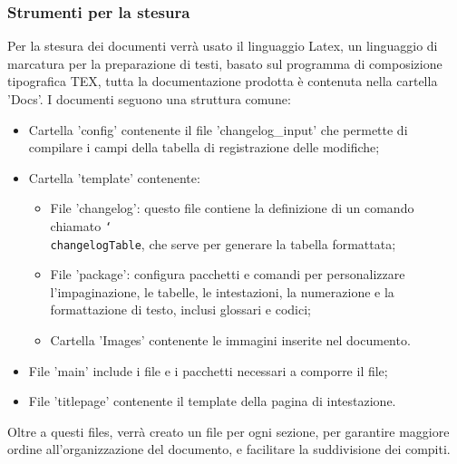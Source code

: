         \subsubsection{Strumenti per la stesura}
        Per la stesura dei documenti verrà usato il linguaggio Latex, un linguaggio di marcatura per la preparazione di testi, basato sul programma di
        composizione tipografica TEX, tutta la documentazione prodotta è contenuta nella cartella 'Docs'. I documenti seguono una struttura comune:
        \begin{itemize}
            \item Cartella 'config' contenente il file 'changelog\_input' che permette di compilare i campi della tabella di registrazione delle modifiche;
            \item Cartella 'template' contenente:
            \begin{itemize}
                \item File 'changelog': questo file contiene la definizione di un comando chiamato \texttt{\char`\\changelogTable}, che serve per generare la tabella formattata;
                \item File 'package': configura pacchetti e comandi per personalizzare l'impaginazione, le tabelle, le intestazioni, la numerazione e la formattazione di testo, inclusi glossari e codici;
                \item Cartella 'Images' contenente le immagini inserite nel documento.
            \end{itemize}
            \item File 'main' include i file e i pacchetti necessari a comporre il file;
            \item File 'titlepage' contenente il template della pagina di intestazione.
        \end{itemize}
        Oltre a questi files, verrà creato un file per ogni sezione, per garantire maggiore ordine all'organizzazione del documento, e facilitare la suddivisione dei compiti.
